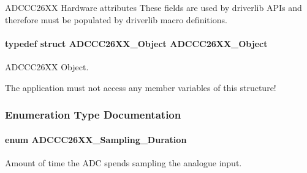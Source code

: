 A\+D\+C\+C\+C26\+X\+X Hardware attributes These fields are used by driverlib A\+P\+Is and therefore must be populated by driverlib macro definitions. 

\paragraph[{A\+D\+C\+C\+C26\+X\+X\+\_\+\+Object}]{\setlength{\rightskip}{0pt plus 5cm}typedef struct {\bf A\+D\+C\+C\+C26\+X\+X\+\_\+\+Object}  {\bf A\+D\+C\+C\+C26\+X\+X\+\_\+\+Object}}\label{_a_d_c_c_c26_x_x_8h_a2aca732c47705fd1004c9fa5d031620d}


A\+D\+C\+C\+C26\+X\+X Object. 

The application must not access any member variables of this structure! 

\subsubsection{Enumeration Type Documentation}
\paragraph[{A\+D\+C\+C\+C26\+X\+X\+\_\+\+Sampling\+\_\+\+Duration}]{\setlength{\rightskip}{0pt plus 5cm}enum {\bf A\+D\+C\+C\+C26\+X\+X\+\_\+\+Sampling\+\_\+\+Duration}}\label{_a_d_c_c_c26_x_x_8h_adb3cf48cf9cac58a07ade90966bdb8f1}


Amount of time the A\+D\+C spends sampling the analogue input. 

